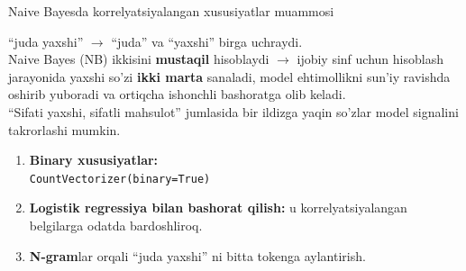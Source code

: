 \documentclass[aspectratio=169,11pt]{beamer}
\begin{document}
\begin{frame}{Naive Bayesda korrelyatsiyalangan xususiyatlar muammosi}
  \begin{tcolorbox}[warnbox,title=Shartli mustaqillik farazi buzilish muammosi:]
    \small
    ``juda yaxshi'' $\to$ ``juda'' va ``yaxshi'' birga uchraydi.\\
    Naive Bayes (NB) ikkisini \textbf{mustaqil} hisoblaydi
    $\to$ ijobiy sinf uchun hisoblash jarayonida yaxshi so'zi \textbf{ikki marta} sanaladi, model ehtimollikni sun'iy ravishda oshirib yuboradi va ortiqcha ishonchli bashoratga olib keladi.\\[4pt]
    ``Sifati yaxshi, sifatli mahsulot'' jumlasida bir ildizga yaqin so'zlar model signalini takrorlashi mumkin.
  \end{tcolorbox}
  \vspace{5pt}
  \begin{tcolorbox}[okbox,title=Yechimlar]
    \small
    \begin{enumerate}
      \item \textbf{Binary xususiyatlar:} \\
            \texttt{CountVectorizer(binary=True)}
      \item \textbf{Logistik regressiya bilan bashorat qilish:} u korrelyatsiyalangan belgilarga odatda bardoshliroq.
      \item \textbf{N-gram}lar orqali ``juda yaxshi'' ni bitta tokenga aylantirish.
    \end{enumerate}
  \end{tcolorbox}
\end{frame}
\end{document}
